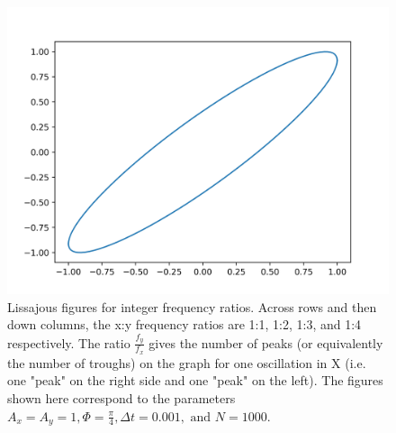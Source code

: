 \documentclass{article}
\begin{document}
\begin{figure}[H]
\includegraphics[width=\textwidth]{a1img3.png}
\caption{Lissajous figures for integer frequency ratios. Across rows and then down columns, the x:y frequency ratios are 1:1, 1:2, 1:3, and 1:4 respectively. The ratio $\frac{f_y}{f_x}$ gives the number of peaks (or equivalently the number of troughs) on the graph for one oscillation in X (i.e. one "peak" on the right side and one "peak" on the left). The figures shown here correspond to the parameters $A_x = A_y = 1, \Phi = \frac{\pi}{4}, \Delta t = 0.001,\text{ and }N = 1000.$}
\end{figure}
\end{document}
